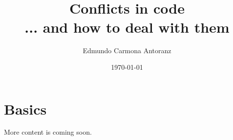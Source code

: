 \documentclass{report}
\title{Conflicts in code \\
	\large ... and how to deal with them}
\author{Edmundo Carmona Antoranz}
\date{\today}
\begin{document}
\begin{titlepage}
\maketitle
\end{titlepage}


\clearpage


\clearpage


\clearpage


\clearpage


\clearpage


\clearpage

\chapter{Basics}

\clearpage


\clearpage


\clearpage


\clearpage


\clearpage


\clearpage


\clearpage




More content is coming soon.


\end{document}
